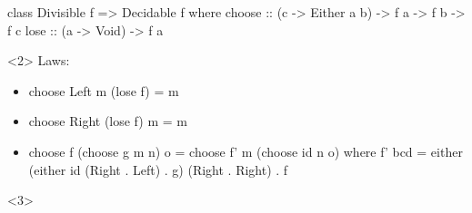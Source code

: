 \documentclass[UKenglish,usenames,dvipsnames,svgnames,table,aspectratio=169,mathserif]{beamer}
\newcommand{\nl}{\vspace{\baselineskip}}
\begin{document}
\begin{frame}[fragile]
\begin{overlayarea}{\textwidth}{0.5\textheight}

\begin{haskellcode}
class Divisible f => Decidable f where
  choose :: (c -> Either a b) -> f a -> f b -> f c
  lose :: (a -> Void) -> f a
\end{haskellcode}

\nl

\begin{onlyenv}<2>
\small
Laws:
\begin{itemize}
\item[]
\begin{haskellcode}
choose Left m (lose f)  = m
\end{haskellcode}
\item[]
\begin{haskellcode}
choose Right (lose f) m = m
\end{haskellcode}
\item[]
\begin{haskellcode}
choose f (choose g m n) o = choose f' m (choose id n o) where
  f' bcd = either (either id (Right . Left) . g) (Right . Right) . f
\end{haskellcode}
\end{itemize}
\end{onlyenv}

\begin{onlyenv}<3>
\end{onlyenv}
\end{overlayarea}

\end{frame}


\end{document}
